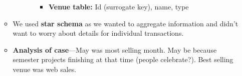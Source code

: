 \begin{multicols}{2}
\begin{itemize}
\begin{itemize}
\begin{itemize}
\begin{itemize}
        \begin{itemize}
                \item
          \textbf{Venue table:} Id (surrogate key), name, type
        \end{itemize}
      \end{itemize}
    \end{itemize}
  \item
    We used \textbf{star schema} as we wanted to aggregate information
    and didn't want to worry about details for individual transactions.
  \item
    \textbf{Analysis of case}---May was most selling month. May be
    because semester projects finishing at that time (people
    celebrate?). Best selling venue was web sales.
  \end{itemize}
\end{itemize}
\end{multicols}